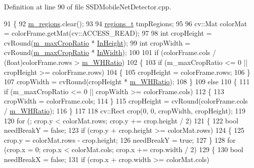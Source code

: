 Definition at line 90 of file S\+S\+D\+Mobile\+Net\+Detector.\+cpp.


\begin{DoxyCode}
91 \{
92     \mbox{\hyperlink{class_base_detector_a409c20093acba261db8354ca72058fce}{m\_regions}}.clear();
93 
94     \mbox{\hyperlink{defines_8h_a01db0de56a20f4342820a093c5154536}{regions\_t}} tmpRegions;
95 
96     cv::Mat colorMat = colorFrame.getMat(cv::ACCESS\_READ);
97 
98     \textcolor{keywordtype}{int} cropHeight = cvRound(\mbox{\hyperlink{class_s_s_d_mobile_net_detector_a5fb35dca36d36fb75c65d1846fe65233}{m\_maxCropRatio}} * \mbox{\hyperlink{class_s_s_d_mobile_net_detector_afc45ce0049d048598325eda63f10056f}{InHeight}});
99     \textcolor{keywordtype}{int} cropWidth = cvRound(\mbox{\hyperlink{class_s_s_d_mobile_net_detector_a5fb35dca36d36fb75c65d1846fe65233}{m\_maxCropRatio}} * \mbox{\hyperlink{class_s_s_d_mobile_net_detector_ac77d00e649eb5c0ddbd12229416e98c5}{InWidth}});
100 
101     \textcolor{keywordflow}{if} (colorFrame.cols / (\textcolor{keywordtype}{float})colorFrame.rows > \mbox{\hyperlink{class_s_s_d_mobile_net_detector_ac4f9e209a12a97a3a8696f1df0d1f046}{m\_WHRatio}})
102     \{
103         \textcolor{keywordflow}{if} (m\_maxCropRatio <= 0 || cropHeight >= colorFrame.rows)
104         \{
105             cropHeight = colorFrame.rows;
106         \}
107         cropWidth = cvRound(cropHeight * \mbox{\hyperlink{class_s_s_d_mobile_net_detector_ac4f9e209a12a97a3a8696f1df0d1f046}{m\_WHRatio}});
108     \}
109     \textcolor{keywordflow}{else}
110     \{
111         \textcolor{keywordflow}{if} (m\_maxCropRatio <= 0 || cropWidth >= colorFrame.cols)
112         \{
113             cropWidth = colorFrame.cols;
114         \}
115         cropHeight = cvRound(colorFrame.cols / \mbox{\hyperlink{class_s_s_d_mobile_net_detector_ac4f9e209a12a97a3a8696f1df0d1f046}{m\_WHRatio}});
116     \}
117 
118     cv::Rect crop(0, 0, cropWidth, cropHeight);
119 
120     \textcolor{keywordflow}{for} (; crop.y < colorMat.rows; crop.y += crop.height / 2)
121     \{
122         \textcolor{keywordtype}{bool} needBreakY = \textcolor{keyword}{false};
123         \textcolor{keywordflow}{if} (crop.y + crop.height >= colorMat.rows)
124         \{
125             crop.y = colorMat.rows - crop.height;
126             needBreakY = \textcolor{keyword}{true};
127         \}
128         \textcolor{keywordflow}{for} (crop.x = 0; crop.x < colorMat.cols; crop.x += crop.width / 2)
129         \{
130             \textcolor{keywordtype}{bool} needBreakX = \textcolor{keyword}{false};
131             \textcolor{keywordflow}{if} (crop.x + crop.width >= colorMat.cols)

\end{DoxyCode}
